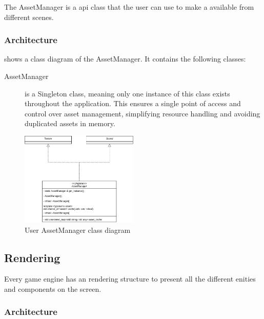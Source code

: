 \documentclass{projdoc}
\begin{document}
The AssetManager is a \gls{api} class that the user can use to make a
 available from different scenes.

\subsubsection{Architecture}

 shows a class diagram of the AssetManager. It contains
the following classes:\noparbreak
\begin{description}
	\item[AssetManager] is a Singleton class, meaning only one instance of this class
		exists throughout the application. This ensures a single point of access and
		control over asset management, simplifying resource handling and avoiding
		duplicated assets in memory.
\end{description}

\begin{figure}
	\centering
	\includegraphics[width=0.5\textwidth]{img/AssesManager.png}
	\caption{User AssetManager class diagram}
	\label{fig:class-assetmanager}
\end{figure}
\subsection{Rendering}

Every game engine has an rendering structure to present all the different enities and
components on the screen.

\subsubsection{Architecture}
\end{document}
